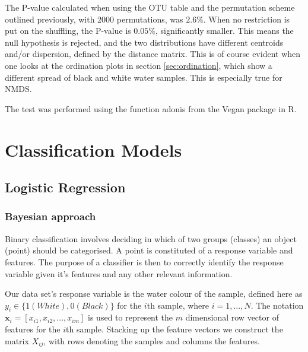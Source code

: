The P-value calculated when using the OTU table and the permutation scheme outlined previously, with 2000 permutations, was $2.6\%$. When no restriction is put on the shuffling, the P-value is $0.05\%$, significantly smaller. This means the null hypothesis is rejected, and the two distributions have different centroids and/or dispersion, defined by the distance matrix. This is of course evident when one looks at the ordination plots in section \ref{sec:ordination}, which show a different spread of black and white water samples. This is especially true for NMDS.

The test was performed using the function adonis from the Vegan package in R.
\section{Classification Models}
\label{sec:classification}
\subsection{Logistic Regression}
\subsubsection{Bayesian approach}
Binary classification involves deciding in which of two groups (classes) an object (point) should be categorised. A point is constituted of a response variable and features. The purpose of a classifier is then to correctly identify the response variable given it's features and any other relevant information. 

Our data set's response variable is the water colour of the sample, defined here as $y_i \in \{ 1 (White),0 (Black)\}$ for the $i$th sample, where $i=1,...,N$. The notation $ \mathbf{x}_i = [x_{i1},x_{i2},...,x_{im}]$ is used to represent the $m$ dimensional row vector of features for the $i$th sample. Stacking up the feature vectors we construct the matrix $X_{ij}$, with rows denoting the samples and columns the features.

